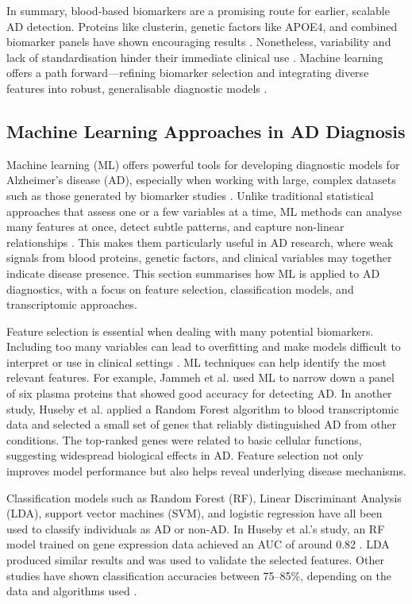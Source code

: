 \documentclass[a4paper,12pt]{article}
\begin{document}
In summary, blood-based biomarkers are a promising route for earlier, scalable AD detection. Proteins like clusterin, genetic factors like APOE4, and combined biomarker panels have shown encouraging results \cite{hampel2018blood}. Nonetheless, variability and lack of standardisation hinder their immediate clinical use \cite{hampel2018blood}. Machine learning offers a path forward—refining biomarker selection and integrating diverse features into robust, generalisable diagnostic models \cite{winchester2023artificial}.

\subsection{Machine Learning Approaches in AD Diagnosis}
Machine learning (ML) offers powerful tools for developing diagnostic models for Alzheimer’s disease (AD), especially when working with large, complex datasets such as those generated by biomarker studies \cite{winchester2023artificial}. Unlike traditional statistical approaches that assess one or a few variables at a time, ML methods can analyse many features at once, detect subtle patterns, and capture non-linear relationships \cite{khosravi2023demystifying, arya2023systematic}. This makes them particularly useful in AD research, where weak signals from blood proteins, genetic factors, and clinical variables may together indicate disease presence. This section summarises how ML is applied to AD diagnostics, with a focus on feature selection, classification models, and transcriptomic approaches.

Feature selection is essential when dealing with many potential biomarkers. Including too many variables can lead to overfitting and make models difficult to interpret or use in clinical settings \cite{saeys2007review}. ML techniques can help identify the most relevant features. For example, Jammeh et al. \cite{jammeh2016identification} used ML to narrow down a panel of six plasma proteins that showed good accuracy for detecting AD. In another study, Huseby et al. \cite{huseby2022blood} applied a Random Forest algorithm to blood transcriptomic data and selected a small set of genes that reliably distinguished AD from other conditions. The top-ranked genes were related to basic cellular functions, suggesting widespread biological effects in AD. Feature selection not only improves model performance but also helps reveal underlying disease mechanisms.

Classification models such as Random Forest (RF), Linear Discriminant Analysis (LDA), support vector machines (SVM), and logistic regression have all been used to classify individuals as AD or non-AD. In Huseby et al.'s study, an RF model trained on gene expression data achieved an AUC of around 0.82 \cite{huseby2022blood}. LDA produced similar results and was used to validate the selected features. Other studies have shown classification accuracies between 75–85\%, depending on the data and algorithms used \cite{winchester2023artificial}.
\end{document}

